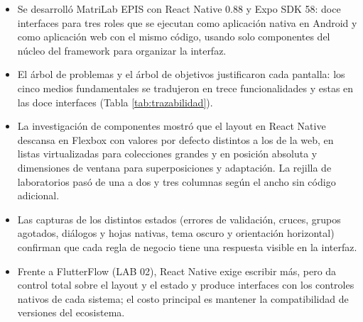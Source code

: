 \clearpage
{}

\begin{itemize}[label=\textcolor{unsared}{\textbullet}, leftmargin=*]
    \item Se desarrolló MatriLab EPIS con React Native 0.88 y Expo SDK 58: doce interfaces para tres roles que se ejecutan como aplicación nativa en Android y como aplicación web con el mismo código, usando solo componentes del núcleo del framework para organizar la interfaz.
    \item El árbol de problemas y el árbol de objetivos justificaron cada pantalla: los cinco medios fundamentales se tradujeron en trece funcionalidades y estas en las doce interfaces (Tabla \ref{tab:trazabilidad}).
    \item La investigación de componentes mostró que el layout en React Native descansa en Flexbox con valores por defecto distintos a los de la web, en listas virtualizadas para colecciones grandes y en posición absoluta y dimensiones de ventana para superposiciones y adaptación. La rejilla de laboratorios pasó de una a dos y tres columnas según el ancho sin código adicional.
    \item Las capturas de los distintos estados (errores de validación, cruces, grupos agotados, diálogos y hojas nativas, tema oscuro y orientación horizontal) confirman que cada regla de negocio tiene una respuesta visible en la interfaz.
    \item Frente a FlutterFlow (LAB 02), React Native exige escribir más, pero da control total sobre el layout y el estado y produce interfaces con los controles nativos de cada sistema; el costo principal es mantener la compatibilidad de versiones del ecosistema.
\end{itemize}

